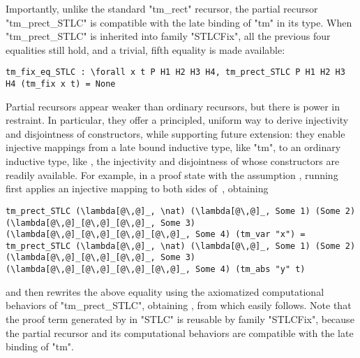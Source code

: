 Importantly, unlike the standard "tm_rect" recursor, the partial recursor
"tm_prect_STLC" is compatible with the late binding of "tm" in its type.
When "tm_prect_STLC" is inherited into family "STLCFix", all the previous four equalities
still hold, and a trivial, fifth equality is made available:

\begin{centered}
\begin{minipage}{.88\textwidth}
\begin{lstlisting}[basicstyle=\fontsize{8.25}{9}\ttfamily]
tm_fix_eq_STLC : \forall x t P H1 H2 H3 H4, tm_prect_STLC P H1 H2 H3 H4 (tm_fix x t) = None
\end{lstlisting}
\end{minipage}
\end{centered}

Partial recursors appear weaker than ordinary recursors,
but there is power in restraint.
In particular,
they offer a principled, uniform way to derive injectivity and disjointness of
constructors, while supporting future extension:
they enable injective mappings from a late bound inductive
type, like "tm", to an ordinary inductive type, like \lsti{\nat},
the injectivity and disjointness of whose constructors are readily
available.
%
For example, in a proof state with the assumption ,
running  first applies an injective mapping to
both sides of~, obtaining

\begin{centered}
\begin{minipage}{.98\textwidth}
\begin{lstlisting}[basicstyle=\fontsize{8.25}{9}\ttfamily]
tm_prect_STLC (\lambda[@\,@]_, \nat) (\lambda[@\,@]_, Some 1) (Some 2) (\lambda[@\,@]_[@\,@]_[@\,@]_, Some 3) (\lambda[@\,@]_[@\,@]_[@\,@]_[@\,@]_, Some 4) (tm_var "x") =
tm_prect_STLC (\lambda[@\,@]_, \nat) (\lambda[@\,@]_, Some 1) (Some 2) (\lambda[@\,@]_[@\,@]_[@\,@]_, Some 3) (\lambda[@\,@]_[@\,@]_[@\,@]_[@\,@]_, Some 4) (tm_abs "y" t)
\end{lstlisting}
\end{minipage}
\end{centered}

\noindent
and then rewrites the above equality using the axiomatized computational behaviors
of "tm_prect_STLC",
obtaining ,
from which  easily follows.
%
Note that the proof term generated by  in "STLC"
is reusable by family "STLCFix", because the partial recursor and its
computational behaviors are compatible with the late binding of "tm".

